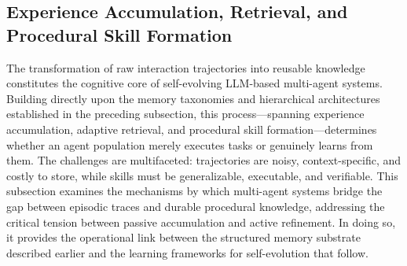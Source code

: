 \documentclass[11pt]{article}
\begin{document}
\subsection{Experience Accumulation, Retrieval, and Procedural Skill Formation}

The transformation of raw interaction trajectories into reusable knowledge constitutes the cognitive core of self-evolving LLM-based multi-agent systems. Building directly upon the memory taxonomies and hierarchical architectures established in the preceding subsection, this process---spanning experience accumulation, adaptive retrieval, and procedural skill formation---determines whether an agent population merely executes tasks or genuinely learns from them. The challenges are multifaceted: trajectories are noisy, context-specific, and costly to store, while skills must be generalizable, executable, and verifiable. This subsection examines the mechanisms by which multi-agent systems bridge the gap between episodic traces and durable procedural knowledge, addressing the critical tension between passive accumulation and active refinement. In doing so, it provides the operational link between the structured memory substrate described earlier and the learning frameworks for self-evolution that follow.
\end{document}
